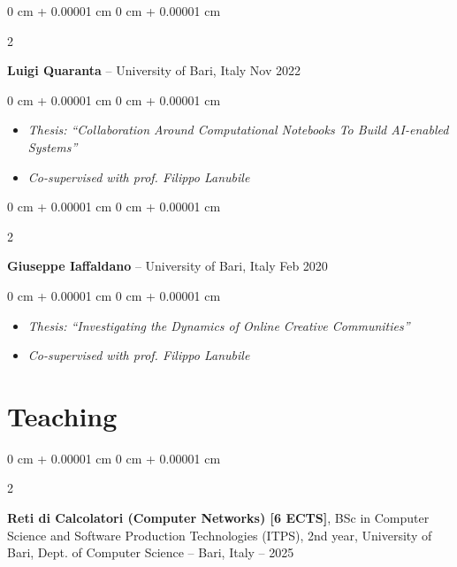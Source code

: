 \documentclass[10pt, a4paper]{article}
\newenvironment{highlights}{
    \begin{itemize}[
        topsep=0.10 cm,
        parsep=0.10 cm,
        partopsep=0pt,
        itemsep=0pt,
        leftmargin=0 cm + 10pt
    ]
}{
    \end{itemize}
} %
\newenvironment{onecolentry}{
    \begin{adjustwidth}{
        0 cm + 0.00001 cm
    }{
        0 cm + 0.00001 cm
    }
}{
    \end{adjustwidth}
} %
\newenvironment{twocolentry}[2][]{
    \onecolentry
    \def\secondColumn{#2}
    \setcolumnwidth{\fill, 4.5 cm}
    \begin{paracol}{2}
}{
    \switchcolumn \raggedleft \secondColumn
    \end{paracol}
    \endonecolentry
} %
\begin{document}
        \begin{twocolentry}{
            Nov 2022
        }
            \textbf{Luigi Quaranta} -- University of Bari, Italy\end{twocolentry}

        \vspace{0.10 cm}
        \begin{onecolentry}
            \begin{highlights}
                \item \textit{Thesis: ``Collaboration Around Computational Notebooks To Build AI-enabled Systems''}
                \item \textit{Co-supervised with prof. Filippo Lanubile}
            \end{highlights}
        \end{onecolentry}


        \vspace{0.2 cm}

        \begin{twocolentry}{
            Feb 2020
        }
            \textbf{Giuseppe Iaffaldano} -- University of Bari, Italy\end{twocolentry}

        \vspace{0.10 cm}
        \begin{onecolentry}
            \begin{highlights}
                \item \textit{Thesis: ``Investigating the Dynamics of Online Creative Communities''}
                \item \textit{Co-supervised with prof. Filippo Lanubile}
            \end{highlights}
        \end{onecolentry}



    
    \section{Teaching}



        
        \begin{twocolentry}{
            2022 – 2025
        }
            \textbf{Reti di Calcolatori (Computer Networks) [6 ECTS]}, BSc in Computer Science and Software Production Technologies (ITPS), 2nd year, University of Bari, Dept. of Computer Science -- Bari, Italy\end{twocolentry}
\end{document}
